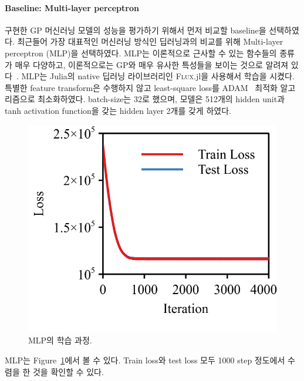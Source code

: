 \documentclass[ba, 11pt]{imsart}
\begin{document}
\paragraph{Baseline: Multi-layer perceptron}
구현한 GP 머신러닝 모델의 성능을 평가하기 위해서 먼저 비교할 baseline을 선택하였다.
최근들어 가장 대표적인 머신러닝 방식인 딥러닝과의 비교를 위해 Multi-layer perceptron (MLP)을 선택하였다.
MLP는 이론적으로 근사할 수 있는 함수들의 종류가 매우 다양하고, 이론적으로는 GP와 매우 유사한 특성들을 보이는 것으로 알려져 있다~\citep{neal_bayesian_1996}.
MLP는 Julia의 native 딥러닝 라이브러리인 \textsc{Flux}.jl을 사용해서 학습을 시켰다.
특별한 feature transform은 수행하지 않고 least-square loss를 ADAM~\citep{kingma_adam_2017} 최적화 알고리즘으로 최소화하였다.
batch-size는 32로 했으며, 모델은 512개의 hidden unit과 tanh activation function을 갖는 hidden layer 2개를 갖게 하였다.
%
\begin{figure}[t]
  \centering
  \includegraphics[scale=1.0]{figures/mlp_train_01.png}
  \caption{MLP의 학습 과정.}\label{fig:mlp_train}
\end{figure}
%
MLP는 Figure~\ref{fig:mlp_train}에서 볼 수 있다.
Train loss와 test loss 모두 1000 step 정도에서 수렴을 한 것을 확인할 수 있다.
\end{document}
